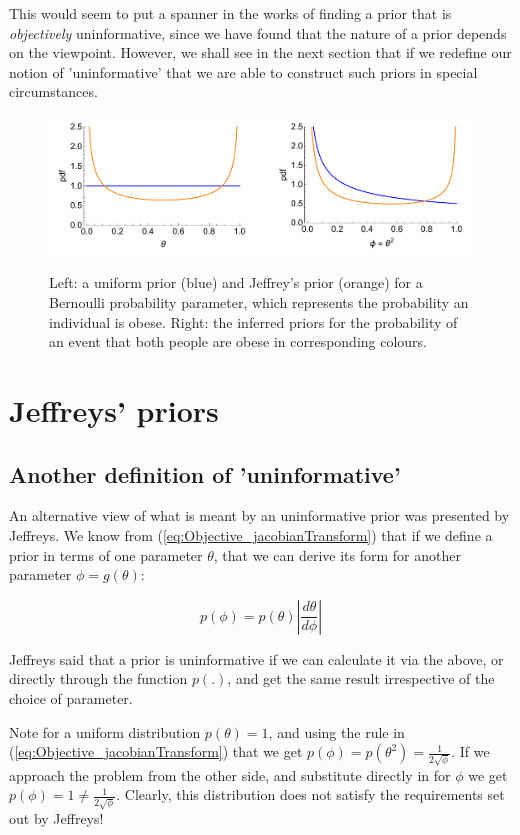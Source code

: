 \documentclass[11pt,fullpage]{book}
\begin{document}
This would seem to put a spanner in the works of finding a prior that is \textit{objectively} uninformative, since we have found that the nature of a prior depends on the viewpoint.  However, we shall see in the next section that if we redefine our notion of 'uninformative' that we are able to construct such priors in special circumstances. 

\begin{figure}
\centering
\scalebox{0.4} 
{\includegraphics{Objective_uniformPrior.pdf}}
\caption{Left: a uniform prior (blue) and Jeffrey's prior (orange) for a Bernoulli probability parameter, which represents the probability an individual is obese. Right: the inferred priors for the probability of an event that both people are obese in corresponding colours.}\label{fig:Objective_uniformPrior}
\end{figure}

\section{Jeffreys' priors}
\subsection{Another definition of 'uninformative'}
An alternative view of what is meant by an uninformative prior was presented by Jeffreys. We know from (\ref{eq:Objective_jacobianTransform}) that if we define a prior in terms of one parameter $\theta$, that we can derive its form for another parameter $\phi = g(\theta)$:

\begin{equation}
p(\phi) = p(\theta)|\frac{d\theta}{d\phi}|
\end{equation}

Jeffreys said that a prior is uninformative if we can calculate it via the above, or directly through the function $p(.)$, and get the same result irrespective of the choice of parameter.

Note for a uniform distribution $p(\theta)=1$, and using the rule in (\ref{eq:Objective_jacobianTransform}) that we get $p(\phi)=p(\theta^2)=\frac{1}{2\sqrt{\phi}}$. If we approach the problem from the other side, and substitute directly in for $\phi$ we get $p(\phi)=1\neq \frac{1}{2\sqrt{\phi}}$. Clearly, this distribution does not satisfy the requirements set out by Jeffreys!
\end{document}
